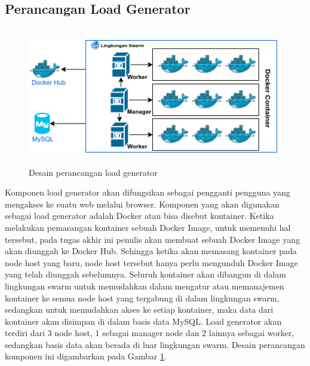     	\subsection{Perancangan Load Generator}
	    	\begin{figure}[h]
	    		\centering
	    		\includegraphics[width=11cm,height=6cm]{Images/C-3/dockerdesain.png}
	    		\caption{Desain perancangan load generator}
	    		\label{dockerdesain}
	    	\end{figure}
    		Komponen load generator akan difungsikan sebagai pengganti pengguna yang mengakses ke suatu web melalui browser. Komponen yang akan digunakan sebagai load generator adalah Docker atau bisa disebut kontainer. Ketika melakukan pemasangan kontainer sebuah Docker Image, untuk memenuhi hal tersebut, pada tugas akhir ini penulis akan membuat sebuah Docker Image yang akan diunggah ke Docker Hub. Sehingga ketika akan memasang kontainer pada node host yang baru, node host tersebut hanya perlu mengunduh Docker Image yang telah diunggah sebelumnya. Seluruh kontainer akan dibangun di dalam lingkungan swarm untuk memudahkan dalam mengatur atau memanajemen kontainer ke semua node host yang tergabung di dalam lingkungan swarm, sedangkan untuk memudahkan akses ke setiap kontainer, maka data dari kontainer akan disimpan di dalam basis data MySQL. Load generator akan terdiri dari 3 node host, 1 sebagai manager node dan 2 lainnya sebagai worker, sedangkan basis data akan berada di luar lingkungan swarm. Desain perancangan komponen ini digambarkan pada Gambar \ref{dockerdesain}.
    		 
    	
